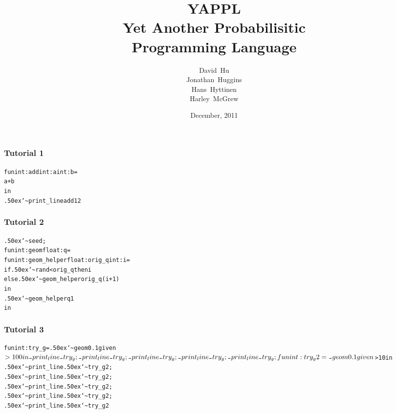 \documentclass[xcolor=dvipsnames]{beamer}
\title[YAPPL] 
{
  YAPPL\\
  Yet Another Probabilisitic\\ Programming Language \\
}
\author[Hu, Huggins, Hyttinen, \& McGrew]
{
  David~Hu\\
  Jonathan~Huggins\\
  Hans~Hyttinen\\
  Harley~McGrew\\
}
\institute[Columbia University]
{
  Columbia University
}
\date[December, 2011]
{December, 2011}
\newcommand\midtilde{{\lower.50ex\hbox{\texttt{\char`\~}}}}
\begin{document}
\begin{frame}
  \titlepage
\end{frame}





\begin{frame}[fragile]
\frametitle{Tutorial 1}
\begin{alltt}
fun int:add int:a int:b = 
   a + b
in 
  {\midtilde}print_line add 1 2
\end{alltt}
\end{frame}

\begin{frame}[fragile]
\frametitle{Tutorial 2}
\begin{alltt}
 {\midtilde}seed;
 fun int:geom float:q =
   fun int:geom_helper float:orig_q int:i =
     if {\midtilde}rand < orig_q then i
     else {\midtilde}geom_helper orig_q (i+1)
   in 
     {\midtilde}geom_helper q 1
 in
\end{alltt}
\end{frame}

\begin{frame}[fragile]
\frametitle{Tutorial 3}
\begin{alltt}
 fun int:try_g = {\midtilde}geom 0.1 given $ > 100 in
 {\midtilde}print_line {\midtilde}try_g;
 {\midtilde}print_line {\midtilde}try_g;
 {\midtilde}print_line {\midtilde}try_g;
 {\midtilde}print_line {\midtilde}try_g;
 {\midtilde}print_line {\midtilde}try_g;
 
 fun int:try_g2 = {\midtilde}geom 0.1 given $ > 10 in
 {\midtilde}print_line {\midtilde}try_g2;
 {\midtilde}print_line {\midtilde}try_g2;
 {\midtilde}print_line {\midtilde}try_g2;
 {\midtilde}print_line {\midtilde}try_g2;
 {\midtilde}print_line {\midtilde}try_g2
\end{alltt}
\end{frame}
\end{document}
